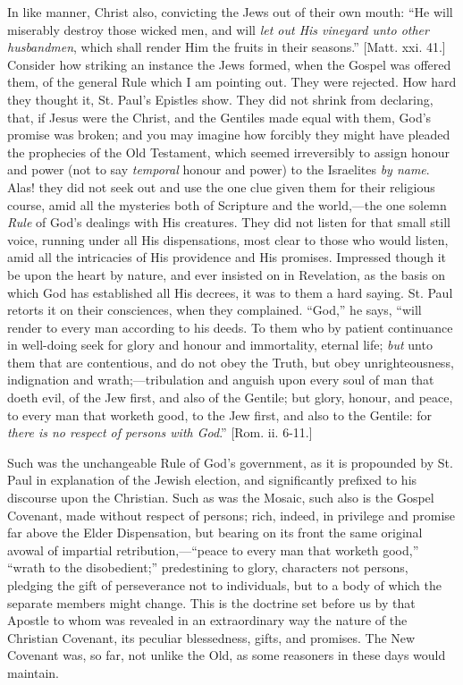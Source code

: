 In like manner, Christ also, convicting the Jews out of their own
mouth: ``He will miserably destroy those wicked men, and will \emph{let
out His vineyard unto other husbandmen}, which shall render Him the
fruits in their seasons.'' [Matt. xxi. 41.] Consider how striking an
instance the Jews formed, when the Gospel was offered them, of the
general Rule which I am pointing out. They were rejected. How hard they
thought it, St. Paul's Epistles show. They did not shrink from
declaring, that, if Jesus were the Christ, and the Gentiles made equal
with them, God's promise was broken; and you may imagine how forcibly
they might have pleaded the prophecies of the Old Testament, which
seemed irreversibly to assign honour and power (not to say \emph{temporal}
honour and power) to the Israelites \emph{by name}. Alas! they did not
seek out and use the one clue given them for their religious course,
amid all the mysteries both of Scripture and the world,—the one solemn
\emph{Rule} of God's dealings with His creatures. They did not listen
for that small still voice, running under all His dispensations, most
clear to those who would listen, amid all the intricacies of His
providence and His promises. Impressed though it be upon the heart by
nature, and ever insisted on in Revelation, as the basis on which God
has established all His decrees, it was to them a hard saying. St. Paul
retorts it on their consciences, when they complained. ``God,''
he says, ``will render to every man according to his deeds. To them
who by patient continuance in well-doing seek for glory and honour and
immortality, eternal life; \emph{but} unto them that are contentious,
and do not obey the Truth, but obey unrighteousness, indignation and
wrath;—tribulation and anguish upon every soul of man that doeth evil,
of the Jew first, and also of the Gentile; but glory, honour, and peace,
to every man that worketh good, to the Jew first, and also to the
Gentile: for \emph{there is no respect of persons with God}.'' [Rom.
ii. 6-11.]

Such was the unchangeable Rule of God's government, as it is
propounded by St. Paul in explanation of the Jewish election, and
significantly prefixed to his discourse upon the Christian. Such as was
the Mosaic, such also is the Gospel Covenant, made without respect of
persons; rich, indeed, in privilege and promise far above the Elder
Dispensation, but bearing on its front the same original avowal of
impartial retribution,—``peace to every man that worketh
good,'' ``wrath to the disobedient;'' predestining to glory,
characters not persons, pledging the gift of perseverance not to
individuals, but to a body of which the separate members might change.
This is the doctrine set before us by that Apostle to whom was revealed
in an extraordinary way the nature of the Christian Covenant, its
peculiar blessedness, gifts, and promises. The New Covenant was, so far,
not unlike the Old, as some reasoners in these days would maintain.

